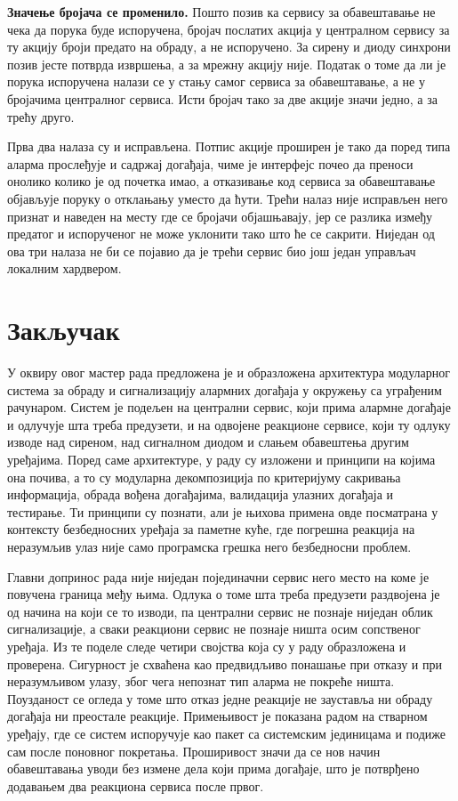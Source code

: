 \documentclass[12pt,oneside]{memoir}
\begin{document}
\textbf{Значење бројача се променило.} Пошто позив ка сервису за обавештавање не чека да
порука буде испоручена, бројач послатих акција у централном сервису за ту акцију броји
предато на обраду, а не испоручено. За сирену и диоду синхрони позив јесте потврда
извршења, а за мрежну акцију није. Податак о томе да ли је порука испоручена налази се у стању самог 
сервиса за обавештавање, а не у бројачима централног сервиса. Исти бројач тако за две акције значи једно,
а за трећу друго.

Прва два налаза су и исправљена. Потпис акције проширен је тако да поред типа аларма прослеђује 
и садржај догађаја, чиме је интерфејс почео да преноси онолико колико је од почетка имао, 
а отказивање код сервиса за обавештавање објављује поруку о отклањању уместо да ћути. 
Трећи налаз није исправљен него признат и наведен на месту где се бројачи објашњавају, 
јер се разлика између предатог и испорученог не може уклонити тако што ће се сакрити. 
Ниједан од ова три налаза не би се појавио да је трећи сервис био још један управљач локалним хардвером.

\chapter{Закључак}
\label{chp:zakljucak}
У оквиру овог мастер рада предложена је и образложена архитектура модуларног система за
обраду и сигнализацију алармних догађаја у окружењу са уграђеним рачунаром. Систем је
подељен на централни сервис, који прима алармне догађаје и одлучује шта треба предузети, и
на одвојене реакционе сервисе, који ту одлуку изводе над сиреном, над сигналном диодом и
слањем обавештења другим уређајима. Поред саме архитектуре, у раду су изложени и
принципи на којима она почива, а то су модуларна декомпозиција по критеријуму сакривања
информација, обрада вођена догађајима, валидација улазних догађаја и тестирање. Ти принципи
су познати, али је њихова примена овде посматрана у контексту безбедносних уређаја за паметне
куће, где погрешна реакција на неразумљив улаз није само програмска грешка него безбедносни
проблем.

Главни допринос рада није ниједан појединачни сервис него место на коме је повучена граница
међу њима. Одлука о томе шта треба предузети раздвојена је од начина на који се то изводи, па
централни сервис не познаје ниједан облик сигнализације, а сваки реакциони сервис не познаје
ништа осим сопственог уређаја. Из те поделе следе четири својства која су у раду образложена
и проверена. Сигурност је схваћена као предвидљиво понашање при отказу и при неразумљивом
улазу, због чега непознат тип аларма не покреће ништа. Поузданост се огледа у томе што отказ
једне реакције не зауставља ни обраду догађаја ни преостале реакције. Примењивост је показана
радом на стварном уређају, где се систем испоручује као пакет са системским јединицама и
подиже сам после поновног покретања. Проширивост значи да се нов начин обавештавања уводи без
измене дела који прима догађаје, што је потврђено додавањем два реакциона сервиса после првог.
\end{document}
